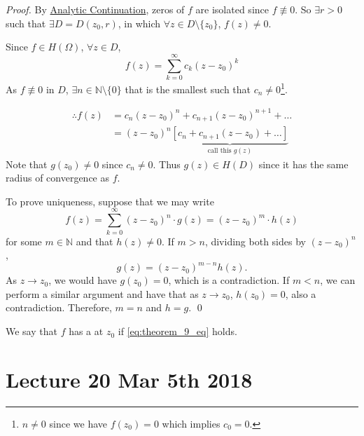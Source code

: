 \documentclass[11pt, oneside]{book}
\begin{document}
\begin{proof}
	By \hyperref[lemma:principle_of_analytic_continuation]{Analytic Continuation}, zeros of $f$ are isolated since $f \not\equiv 0$. So $\exists r > 0$ such that $\exists D = D(z_0, r)$, in which $\forall z \in D \setminus \{z_0\}$, $f(z) \neq 0$.

	Since $f \in H(\Omega)$, $\forall z \in D$,
	\begin{equation*}
		f(z) = \sum_{k=0}^{\infty} c_k (z - z_0)^k
	\end{equation*}
	As $f \not\equiv 0$ in $D$, $\exists n \in \mathbb{N} \setminus \{ 0\}$ that is the smallest such that $c_n \neq 0$\footnote{$n \neq 0$ since we have $f(z_0) = 0$ which implies $c_0 = 0$.}.

	\begin{align*}
		\therefore f(z)
			&= c_n(z - z_0)^n + c_{n + 1} (z - z_0)^{n + 1} + \hdots \\
			&= (z - z_0)^n \underbrace{\left[ c_n + c_{n + 1} (z - z_0) + \hdots \right]}_{\text{call this } g(z)}
	\end{align*}
	Note that $g(z_0) \neq 0$ since $c_n \neq 0$. Thus $g(z) \in H(D)$ since it has the same radius of convergence as $f$.

	To prove uniqueness, suppose that we may write
	\begin{equation*}
		f(z) = \sum_{k=0}^{\infty} (z - z_0)^n \cdot g(z) = (z - z_0)^m \cdot h(z)
	\end{equation*}
	for some $m \in \mathbb{N}$ and that $h(z) \neq 0$. If $m > n$, dividing both sides by $(z - z_0)^n$,
	\begin{equation*}
		g(z) = (z - z_0)^{m - n} h(z).
	\end{equation*}
	As $z \to z_0$, we would have $g(z_0) = 0$, which is a contradiction. If $m < n$, we can perform a similar argument and have that as $z \to z_0$, $h(z_0) = 0$, also a contradiction. Therefore, $m = n$ and $h = g$. \qed
\end{proof}

We say that $f$ has a  at $z_0$ if \cref{eq:theorem_9_eq} holds.



\chapter{Lecture 20 Mar 5th 2018}
	\label{chapter:lecture_20_mar_5th_2018}
\end{document}
